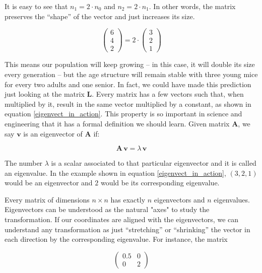 \documentclass[12pt]{article}
\begin{document}
It is easy to see that $n_1 = 2 \cdot n_0$  and $n_2 = 2 \cdot n_1$. In other words, the matrix preserves the ``shape'' of the vector and just increases its size.

\begin{equation}
 \begin{pmatrix} 6\\ 4 \\ 2\end{pmatrix} =  2 \cdot\begin{pmatrix} 3\\ 2 \\ 1\end{pmatrix} 
 \label{eigenvect_in_action}
\end{equation}

This means our population will keep growing -- in this case, it will double its size every generation -- but the age structure will remain stable with three young mice for every two adults and one senior. In fact, we could have made this prediction just looking at the matrix $\mathbf{L}$. Every matrix has a few vectors such that, when multiplied by it, result in the same vector multiplied by a constant, as shown in equation \ref{eigenvect_in_action}. This property is so important in science and engineering that it has a formal definition we should learn. Given matrix $\mathbf{A}$, we say $\mathbf{v}$ is an eigenvector of  $\mathbf{A}$ if:
 
\begin{equation}
	\label{eigendefinition}
	\mathbf{A} \, \mathbf{v}  = \lambda  \,	\mathbf{v}   
\end{equation}

The number $\lambda$ is a scalar associated to that particular eigenvector and it is called an eigenvalue. In the example shown in equation \ref{eigenvect_in_action}, $(3,2,1)$ would be an eigenvector and $2$ would be its corresponding eigenvalue.

Every matrix of dimensions $n \times n$ has exactly $n$ eigenvectors and $n$ eigenvalues. Eigenvectors can be understood as the natural "axes" to study the transformation. If our coordinates are aligned with the eigenvectors, we can understand any transformation as just ``stretching'' or ``shrinking'' the vector in each direction by the corresponding eigenvalue. For instance, the matrix

\begin{equation}
	\begin{pmatrix} 0.5 & 0\\ 0 &  2 \end{pmatrix} 
\end{equation}
\end{document}
